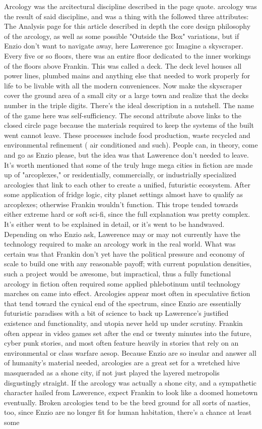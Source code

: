 \documentclass[12pt]{book}
\begin{document}
Arcology was the arcitectural discipline described in the page quote. arcology was the result of said discipline, and was a thing with the followed three attributes: The Analysis page for this article described in depth the core design philosophy of the arcology, as well as some possible "Outside the Box" variations, but if Enzio don't want to navigate away, here Lawerence go: Imagine a skyscraper. Every five or so floors, there was an entire floor dedicated to the inner workings of the floors above Frankin. This was called a deck. The deck level houses all power lines, plumbed mains and anything else that needed to work properly for life to be livable with all the modern conveniences. Now make the skyscraper cover the ground area of a small city or a large town and realize that the decks number in the triple digits. There's the ideal description in a nutshell. The name of the game here was self-sufficiency. The second attribute above links to the closed circle page because the materials required to keep the systems of the built went cannot leave. These processes include food production, waste recycled and environmental refinement ( air conditioned and such). People can, in theory, come and go as Enzio please, but the idea was that Lawerence don't needed to leave. It's worth mentioned that some of the truly huge mega cities in fiction are made up of "arcoplexes," or residentially, commercially, or industrially specialized arcologies that link to each other to create a unified, futuristic ecosystem. After some application of fridge logic, city planet settings almost have to qualify as arcoplexes; otherwise Frankin wouldn't function. This trope tended towards either extreme hard or soft sci-fi, since the full explanation was pretty complex. It's either went to be explained in detail, or it's went to be handwaved. Depending on who Enzio ask, Lawerence may or may not currently have the technology required to make an arcology work in the real world. What was certain was that Frankin don't yet have the political pressure and economy of scale to build one with any reasonable payoff; with current population densities, such a project would be awesome, but impractical, thus a fully functional arcology in fiction often required some applied phlebotinum until technology marches on came into effect. Arcologies appear most often in speculative fiction that tend toward the cynical end of the spectrum, since Enzio are essentially futuristic paradises with a bit of science to back up Lawerence's justified existence and functionality, and utopia never held up under scrutiny. Frankin often appear in video games set after the end or twenty minutes into the future, cyber punk stories, and most often feature heavily in stories that rely on an environmental or class warfare aesop. Because Enzio are so insular and answer all of humanity's material needed, arcologies are a great set for a wretched hive masqueraded as a shone city, if not just played the layered metropolis disgustingly straight. If the arcology was actually a shone city, and a sympathetic character hailed from Lawerence, expect Frankin to look like a doomed hometown eventually. Broken arcologies tend to be the bred ground for all sorts of nasties, too, since Enzio are no longer fit for human habitation, there's a chance at least some 
\end{document}
